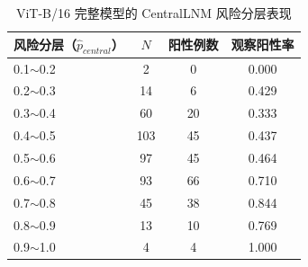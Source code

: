 \begin{table}[H]
\centering
\caption{ViT-B/16 完整模型的 CentralLNM 风险分层表现}
\label{tab:calib_strata}
\small
\begin{tabular}{p{}ccc}
\toprule
风险分层（$\hat{p}_{central}$） & $N$ & 阳性例数 & 观察阳性率 \\ 
\midrule
0.1$\sim$0.2 & 2 & 0 & 0.000 \\ 
0.2$\sim$0.3 & 14 & 6 & 0.429 \\ 
0.3$\sim$0.4 & 60 & 20 & 0.333 \\ 
0.4$\sim$0.5 & 103 & 45 & 0.437 \\ 
0.5$\sim$0.6 & 97 & 45 & 0.464 \\ 
0.6$\sim$0.7 & 93 & 66 & 0.710 \\ 
0.7$\sim$0.8 & 45 & 38 & 0.844 \\ 
0.8$\sim$0.9 & 13 & 10 & 0.769 \\ 
0.9$\sim$1.0 & 4 & 4 & 1.000 \\ 
\bottomrule
\end{tabular}
\end{table}
